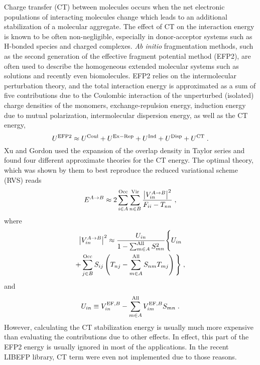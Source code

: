 Charge transfer (CT) between molecules occurs when the net electronic populations 
of interacting molecules change which leads to an additional stabilization 
of a molecular aggregate. The effect of CT on the interaction energy 
is known to be often non\hyp{}negligible, especially
in donor\hyp{}acceptor systems such as H\hyp{}bonded species
and charged complexes.
\emph{Ab initio} fragmentation methods, such as
the second generation of the effective fragment potential method (EFP2),
are often used to describe the homogeneous extended molecular systems 
such as solutions
and recently even biomolecules. EFP2 relies on the intermolecular 
perturbation theory, and the total interaction energy is approximated as
a sum of five contributions due to the Coulombic interaction of the unperturbed (isolated)
charge densities of the monomers, exchange\hyp{}repulsion energy,
induction energy due to mutual polarization, intermolecular dispersion energy,
as well as the CT energy,
%
\begin{equation}
 U^{\rm EFP2} \approx U^{\rm Coul} + U^{\rm Ex-Rep} + U^{\rm Ind} + U^{\rm Disp} + U^{\rm CT} \;.
\end{equation}
%
Xu and Gordon used the expansion of the overlap density 
in Taylor series and found four different approximate
theories for the CT energy. The optimal theory, which was shown
by them to best reproduce the reduced variational scheme (RVS)
reads
%
\begin{equation}
 E^{A\rightarrow B} \approx 
 2\sum_{i\in A}^{\rm Occ}
  \sum_{n\in B}^{\rm Vir}
   \frac{ \left| V_{in}^{A\rightarrow B} \right|^2}{F_{ii} - T_{nn}} \;,
\end{equation}
%
where
%
\begin{multline}
 \left| V_{in}^{A\rightarrow B} \right|^2 \approx
 \frac{U_{in}}{1-\sum_{m\in A}^{\rm All} S_{mn}^2}
 \Bigg\{
   U_{in} \\ + \sum_{j\in B}^{\rm Occ} S_{ij} 
   \left( 
     T_{nj} - \sum_{m\in A}^{\rm All} S_{nm} T_{mj}
   \right)
 \Bigg\} \;,
\end{multline}
%
and 
%
\begin{equation}
 U_{in} \equiv V_{in}^{{\rm EF},B} - \sum_{m\in A}^{\rm All} V_{im}^{{\rm EF},B} S_{mn} \;.
\end{equation}
%
However, calculating the CT stabilization energy is usually much more expensive 
than evaluating the contributions due to other effects.\cite{Gordon.Fedorov.Pruitt.Slipchenko.ChemRev.2012}
In effect,
this part of the EFP2 energy is usually ignored in most of the applications. In the 
recent LIBEFP library, CT term were even not implemented due to those reasons.


